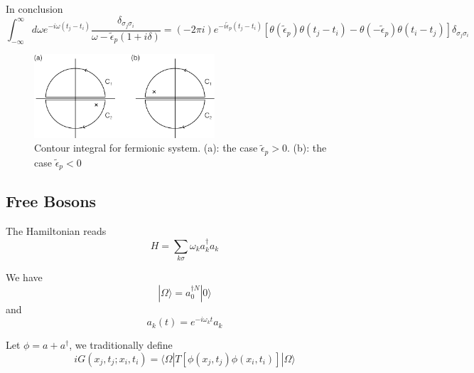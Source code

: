\documentclass[12pt]{book}
\begin{document}
	In conclusion
	\begin{equation}
		\int_{-\infty}^\infty d\omega e^{-i\omega(t_j-t_i)}\frac {\delta_{\sigma_j\sigma_i}}{\omega-\tilde\epsilon_p(1+i\delta)}=(-2\pi i)e^{-i\tilde\epsilon_p(t_j-t_i)}[\theta(\tilde\epsilon_p)\theta(t_j-t_i)-\theta(-\tilde\epsilon_p)\theta(t_i-t_j)]\delta_{\sigma_j\sigma_i}
	\end{equation}
	
	\begin{figure}[htb]
		\centering  
		\includegraphics[width=0.6\textwidth]{resources/chap_green_0T/contour1.pdf}
		\caption{Contour integral for fermionic system. (a): the case $\tilde\epsilon_p>0$. (b): the case $\tilde\epsilon_p<0$}
		\label{fig:contour_fermion} 
	\end{figure}

	\subsection{Free Bosons}

	The Hamiltonian reads
	\begin{equation}
		H=\sum_{k\sigma}\omega_k a_k^\dagger a_k
	\end{equation}
	
	We have
	\begin{equation}
		|\Omega\rangle=a_0^{\dagger N}|0\rangle
	\end{equation}
	and
	\begin{equation}
		a_k(t)=e^{-i\omega_kt}a_k
	\end{equation}
	
	Let $\phi=a+a^\dagger$, we traditionally define
	\begin{equation}
		iG(x_j,t_j;x_i,t_i)=\langle \Omega|T[\phi(x_j,t_j)\phi(x_i,t_i)]|\Omega\rangle
	\end{equation}
	
\end{document}
